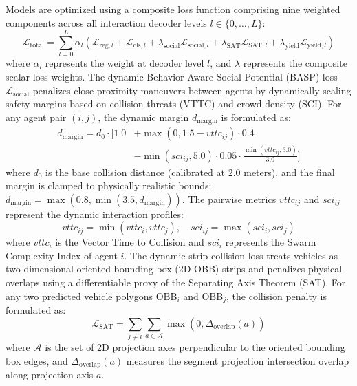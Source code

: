\documentclass{article}
\begin{document}
Models are optimized using a composite loss function comprising nine weighted components across all interaction decoder levels $l \in \{0, \dots, L\}$:
\begin{equation}
\mathcal{L}_{\text{total}} = \sum_{l=0}^L \alpha_l \left( \mathcal{L}_{\text{reg}, l} + \mathcal{L}_{\text{cls}, l} + \lambda_{\text{social}} \mathcal{L}_{\text{social}, l} + \lambda_{\text{SAT}} \mathcal{L}_{\text{SAT}, l} + \lambda_{\text{yield}} \mathcal{L}_{\text{yield}, l} \right)
\end{equation}
where $\alpha_l$ represents the weight at decoder level $l$, and $\lambda$ represents the composite scalar loss weights. The dynamic Behavior Aware Social Potential (BASP) loss $\mathcal{L}_{\text{social}}$ penalizes close proximity maneuvers between agents by dynamically scaling safety margins based on collision threats (VTTC) and crowd density (SCI). For any agent pair $(i, j)$, the dynamic margin $d_{\text{margin}}$ is formulated as:
\begin{equation}
\begin{aligned}
d_{\text{margin}} = d_0 \cdot \Big[ 1.0 &+ \max\left(0, 1.5 - vttc_{ij}\right) \cdot 0.4 \\
&- \min\left(sci_{ij}, 5.0\right) \cdot 0.05 \cdot \frac{\min\left(vttc_{ij}, 3.0\right)}{3.0} \Big]
\end{aligned}
\end{equation}
where $d_0$ is the base collision distance (calibrated at $2.0$ meters), and the final margin is clamped to physically realistic bounds: $d_{\text{margin}} = \max\left(0.8, \min\left(3.5, d_{\text{margin}}\right)\right)$. The pairwise metrics $vttc_{ij}$ and $sci_{ij}$ represent the dynamic interaction profiles:
\begin{equation}
vttc_{ij} = \min\left( vttc_i, vttc_j \right), \quad sci_{ij} = \max\left( sci_i, sci_j \right)
\end{equation}
where $vttc_i$ is the Vector Time to Collision and $sci_i$ represents the Swarm Complexity Index of agent $i$. The dynamic strip collision loss treats vehicles as two dimensional oriented bounding box (2D-OBB) strips and penalizes physical overlaps using a differentiable proxy of the Separating Axis Theorem (SAT). For any two predicted vehicle polygons $\text{OBB}_i$ and $\text{OBB}_j$, the collision penalty is formulated as:
\begin{equation}
\mathcal{L}_{\text{SAT}} = \sum_{j \neq i} \sum_{a \in \mathcal{A}} \max \left( 0, \Delta_{\text{overlap}}(a) \right)
\end{equation}
where $\mathcal{A}$ is the set of 2D projection axes perpendicular to the oriented bounding box edges, and $\Delta_{\text{overlap}}(a)$ measures the segment projection intersection overlap along projection axis $a$. 
\end{document}

